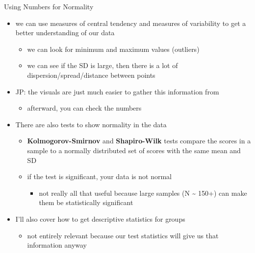 \documentclass[
  ignorenonframetext,
]{beamer}
\providecommand{\tightlist}{%
  \setlength{\itemsep}{0pt}\setlength{\parskip}{0pt}}
\begin{document}
\begin{frame}{Using Numbers for Normality}
\protect\hypertarget{using-numbers-for-normality}{}
\begin{itemize}
\item
  we can use measures of central tendency and measures of variability to
  get a better understanding of our data

  \begin{itemize}
  \item
    we can look for minimum and maximum values (outliers)
  \item
    we can see if the SD is large, then there is a lot of
    dispersion/spread/distance between points
  \end{itemize}
\item
  JP: the visuals are just much easier to gather this information from

  \begin{itemize}
  \tightlist
  \item
    afterward, you can check the numbers
  \end{itemize}
\item
  There are also tests to show normality in the data

  \begin{itemize}
  \item
    \textbf{Kolmogorov-Smirnov} and \textbf{Shapiro-Wilk} tests compare
    the scores in a sample to a normally distributed set of scores with
    the same mean and SD
  \item
    if the test is significant, your data is not normal

    \begin{itemize}
    \tightlist
    \item
      not really all that useful because large samples (N
      \textasciitilde{} 150+) can make them be statistically significant
    \end{itemize}
  \end{itemize}
\item
  I'll also cover how to get descriptive statistics for groups

  \begin{itemize}
  \tightlist
  \item
    not entirely relevant because our test statistics will give us that
    information anyway
  \end{itemize}
\end{itemize}
\end{frame}
\end{document}
